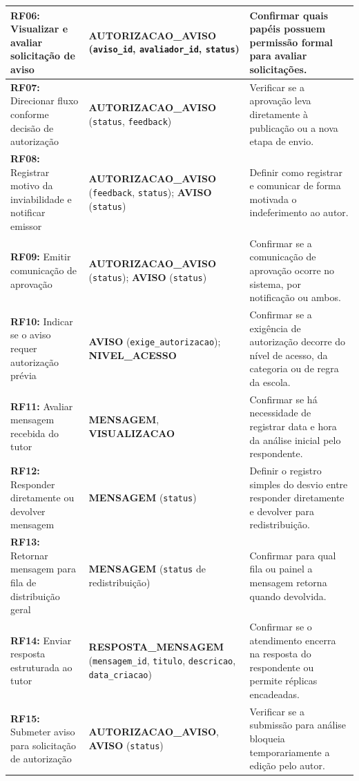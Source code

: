 \documentclass[a4paper,12pt]{report}
\begin{document}
\begin{longtable}{|p{3.4cm}|p{4.8cm}|p{6.4cm}|}
\hline
\textbf{RF06:} Visualizar e avaliar solicitação de aviso & \textbf{AUTORIZACAO\_AVISO} (\texttt{aviso\_id}, \texttt{avaliador\_id}, \texttt{status}) & Confirmar quais papéis possuem permissão formal para avaliar solicitações. \\
\hline
\textbf{RF07:} Direcionar fluxo conforme decisão de autorização & \textbf{AUTORIZACAO\_AVISO} (\texttt{status}, \texttt{feedback}) & Verificar se a aprovação leva diretamente à publicação ou a nova etapa de envio. \\
\hline
\textbf{RF08:} Registrar motivo da inviabilidade e notificar emissor & \textbf{AUTORIZACAO\_AVISO} (\texttt{feedback}, \texttt{status}); \textbf{AVISO} (\texttt{status}) & Definir como registrar e comunicar de forma motivada o indeferimento ao autor. \\
\hline
\textbf{RF09:} Emitir comunicação de aprovação & \textbf{AUTORIZACAO\_AVISO} (\texttt{status}); \textbf{AVISO} (\texttt{status}) & Confirmar se a comunicação de aprovação ocorre no sistema, por notificação ou ambos. \\
\hline
\textbf{RF10:} Indicar se o aviso requer autorização prévia & \textbf{AVISO} (\texttt{exige\_autorizacao}); \textbf{NIVEL\_ACESSO} & Confirmar se a exigência de autorização decorre do nível de acesso, da categoria ou de regra da escola. \\
\hline
\textbf{RF11:} Avaliar mensagem recebida do tutor & \textbf{MENSAGEM}, \textbf{VISUALIZACAO} & Confirmar se há necessidade de registrar data e hora da análise inicial pelo respondente. \\
\hline
\textbf{RF12:} Responder diretamente ou devolver mensagem & \textbf{MENSAGEM} (\texttt{status}) & Definir o registro simples do desvio entre responder diretamente e devolver para redistribuição. \\
\hline
\textbf{RF13:} Retornar mensagem para fila de distribuição geral & \textbf{MENSAGEM} (\texttt{status} de redistribuição) & Confirmar para qual fila ou painel a mensagem retorna quando devolvida. \\
\hline
\textbf{RF14:} Enviar resposta estruturada ao tutor & \textbf{RESPOSTA\_MENSAGEM} (\texttt{mensagem\_id}, \texttt{titulo}, \texttt{descricao}, \texttt{data\_criacao}) & Confirmar se o atendimento encerra na resposta do respondente ou permite réplicas encadeadas. \\
\hline
\textbf{RF15:} Submeter aviso para solicitação de autorização & \textbf{AUTORIZACAO\_AVISO}, \textbf{AVISO} (\texttt{status}) & Verificar se a submissão para análise bloqueia temporariamente a edição pelo autor. \\

\end{longtable}
\end{document}
